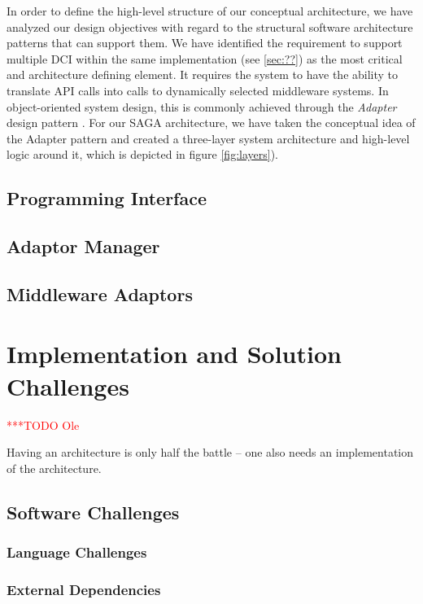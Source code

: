 \documentclass[a4paper,12pt]{article}
\newcommand{\todo}[1]{     {\textcolor{red}  { ***TODO      #1 }}}
\newcommand{\todo}[1]{}
\begin{document}
In order to define the high-level structure of our conceptual architecture, we
have analyzed our design objectives with regard to the structural software
architecture patterns that can support them. We have identified the requirement
to support multiple DCI within the same implementation (see \ref{sec:??}) as
the most critical and architecture defining element. It requires the system to
have the ability to translate API calls into calls to dynamically selected
middleware systems. In object-oriented system design, this is commonly achieved
through the \textit{Adapter} design pattern \cite{XXX}. For our SAGA
architecture, we have taken the conceptual idea of the Adapter pattern and
created a three-layer system architecture and high-level logic around it, which
is depicted in figure \ref{fig:layers}).


\subsection{Programming Interface}

\subsection{Adaptor Manager}

\subsection{Middleware Adaptors}


% 
\section{Implementation and Solution Challenges}\todo{Ole}

Having an architecture is only half the battle -- one also needs an
implementation of the architecture.


\subsection{Software Challenges}

\subsubsection{Language Challenges}

\subsubsection{External Dependencies}
\end{document}
